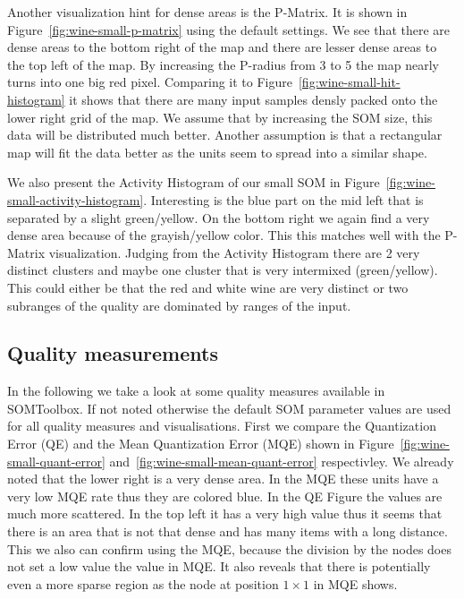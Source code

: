 \documentclass{acm_proc_article-sp}
\begin{document}
Another visualization hint for dense areas is the P-Matrix. It is shown in Figure~\ref{fig:wine-small-p-matrix} using
the default settings. We see that there are dense areas to the bottom right of the map and there are lesser
dense areas to the top left of the map.
By increasing the P-radius from 3 to 5 the map nearly turns into one big red pixel.
Comparing it to Figure~\ref{fig:wine-small-hit-histogram} it shows that there are many input samples densly packed
onto the lower right grid of the map. We assume that by increasing the SOM size, this data will be distributed much better. Another assumption is that a rectangular map will fit the data better as the units seem to spread into a similar shape.

We also present the Activity Histogram of our small SOM in Figure~\ref{fig:wine-small-activity-histogram}.
Interesting is the blue part on the mid left that is separated by a slight green/yellow.
On the bottom right we again find a very dense area because of the grayish/yellow color. This this matches
well with the P-Matrix visualization. Judging from the Activity Histogram there are 2 very distinct clusters
and maybe one cluster that is very intermixed (green/yellow). This could either be that the
red and white wine are very distinct or two subranges of the quality are dominated by ranges of the input.

\subsection{Quality measurements}

In the following we take a look at some quality measures available in SOMToolbox.
If not noted otherwise the default SOM parameter values are used for all quality measures and visualisations.
First we compare the Quantization Error (QE) and the Mean Quantization Error (MQE) shown in
Figure~\ref{fig:wine-small-quant-error} and~\ref{fig:wine-small-mean-quant-error} respectivley.
We already noted that the lower right is a very dense area. In the MQE these units have a very low
MQE rate thus they are colored blue. In the QE Figure the values are much more scattered. In
the top left it has a very high value thus it seems that there is an area that is not that dense
and has many items with a long distance. This we also can confirm using the MQE, because the division
by the nodes does not set a low value the value in MQE. It also reveals that there is potentially even a more sparse
region as the node at position $1\times1$ in MQE shows.
\end{document}
